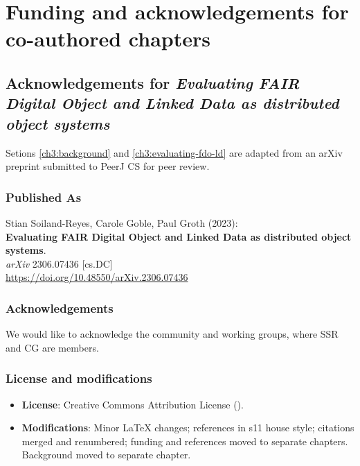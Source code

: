\section{Funding and acknowledgements for co-authored chapters}


\subsection{Acknowledgements for \textit{Evaluating FAIR Digital Object and Linked Data as distributed object systems}}\label{ch11:fdo}

Setions \vref{ch3:background} and \vref{ch3:evaluating-fdo-ld} are adapted from an arXiv preprint submitted to PeerJ CS for peer review.

\subsubsection*{Published As}

Stian Soiland-Reyes, Carole Goble, Paul Groth (2023):\\
\textbf{Evaluating FAIR Digital Object and Linked Data as distributed object systems}.\\
\emph{arXiv} 2306.07436 [cs.DC] \\
\url{https://doi.org/10.48550/arXiv.2306.07436}

\subsubsection*{Acknowledgements}

We would like to acknowledge the  community and working groups, where SSR and CG are members.


\subsubsection*{License and modifications}

\begin{itemize}
\tightlist
\item
  \textbf{License}: Creative Commons Attribution License
  ().
\item
  \textbf{Modifications}: Minor LaTeX changes; references in s11 house style; 
  citations merged and renumbered; 
  funding and references moved to separate chapters. Background moved to separate chapter.
\end{itemize}

